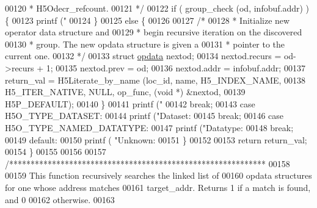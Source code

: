 \begin{DoxyCode}
{{00120 \textcolor{comment}{             * H5Odecr\_refcount.}
00121 \textcolor{comment}{             */}
00122             \textcolor{keywordflow}{if} ( group\_check (od, infobuf.addr) ) \{
00123                 printf (\textcolor{stringliteral}{"%
00124             \}
00125             \textcolor{keywordflow}{else} \{
00126 
00127                 \textcolor{comment}{/*}
00128 \textcolor{comment}{                 * Initialize new operator data structure and}
00129 \textcolor{comment}{                 * begin recursive iteration on the discovered}
00130 \textcolor{comment}{                 * group.  The new opdata structure is given a}
00131 \textcolor{comment}{                 * pointer to the current one.}
00132 \textcolor{comment}{                 */}
00133                 \textcolor{keyword}{struct }\hyperlink{structopdata}{opdata} nextod;
00134                 nextod.recurs = od->recurs + 1;
00135                 nextod.prev = od;
00136                 nextod.addr = infobuf.addr;
00137                 return\_val = H5Literate\_by\_name (loc\_id, name, H5\_INDEX\_NAME,
00138                             H5\_ITER\_NATIVE, NULL, op\_func, (\textcolor{keywordtype}{void} *) &nextod,
00139                             H5P\_DEFAULT);
00140             \}
00141             printf (\textcolor{stringliteral}{"%
00142             \textcolor{keywordflow}{break};
00143         \textcolor{keywordflow}{case} H5O\_TYPE\_DATASET:
00144             printf (\textcolor{stringliteral}{"Dataset: %
00145             \textcolor{keywordflow}{break};
00146         \textcolor{keywordflow}{case} H5O\_TYPE\_NAMED\_DATATYPE:
00147             printf (\textcolor{stringliteral}{"Datatype: %
00148             \textcolor{keywordflow}{break};
00149         \textcolor{keywordflow}{default}:
00150             printf ( \textcolor{stringliteral}{"Unknown: %
00151     \}
00152 
00153     \textcolor{keywordflow}{return} return\_val;
00154 \}
00155 
00156 
00157 \textcolor{comment}{/************************************************************}
00158 \textcolor{comment}{}
00159 \textcolor{comment}{  This function recursively searches the linked list of}
00160 \textcolor{comment}{  opdata structures for one whose address matches}
00161 \textcolor{comment}{  target\_addr.  Returns 1 if a match is found, and 0}
00162 \textcolor{comment}{  otherwise.}
00163 \textcolor{comment}{}
}}}}}}}
\end{DoxyCode}
